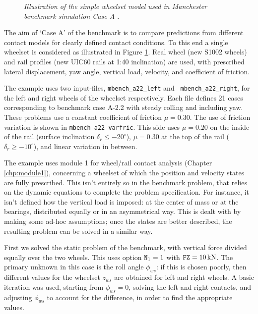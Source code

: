 \documentclass[12pt]{report}
\begin{document}
\begin{figure}[bt]
\centering
{}
\caption{\em Illustration of the simple wheelset model used in Manchester
benchmark simulation Case A \cite{Shackleton2006}.}
\label{fig:manch_wheelset}
\end{figure}

The aim of `Case A' of the benchmark is to compare predictions from
different contact models for clearly defined contact conditions. To this
end a single wheelset is considered as illustrated in Figure
\ref{fig:manch_wheelset}. Real wheel (new S1002 wheels) and rail profiles
(new UIC60 rails at 1:40 inclination) are used, with prescribed lateral
displacement, yaw angle, vertical load, velocity, and coefficient of friction.

The example uses two input-files, {\tt mbench\_a22\_left} and {\tt
mbench\_a22\_right}, for the left and right wheels of the wheelset
respectively. Each file defines 21 cases corresponding to benchmark case
A-2.2 with steady rolling and including yaw. These problems use
a constant coefficient of friction $\mu=0.30$. The use of friction
variation is shown in {\tt mbench\_a22\_varfric}. This side uses
$\mu=0.20$ on the inside of the rail (surface inclination $\delta_r
\le -20^\circ$), $\mu=0.30$ at the top of the rail ($\delta_r\ge
-10^\circ$), and linear variation in between.

The example uses module 1 for wheel/rail contact analysis (Chapter
\ref{chp:module1}), concerning a wheelset of which the position and
velocity states are fully prescribed.  This isn't entirely so in the
benchmark problem, that relies on the dynamic equations to complete the
problem specification. For instance, it isn't defined how the vertical load
is imposed: at the center of mass or at the bearings, distributed equally
or in an asymmetrical way. This is dealt with by making some ad-hoc
assumptions; once the states are better described, the resulting problem
can be solved in a similar way.

First we solved the static problem of the benchmark, with vertical force
divided equally over the two wheels. This uses option ${\tt N}_1=1$ with
${\tt FZ}=10\,\mathrm{kN}$. The primary unknown in this case is the roll angle
$\phi_{ws}$: if this is chosen poorly, then different values for the
wheelset $z_{ws}$ are obtained for left and right wheels. A basic iteration
was used, starting from $\phi_{ws}=0$, solving the left and right contacts,
and adjusting $\phi_{ws}$ to account for the difference, in order to find
the appropriate values.
\end{document}
